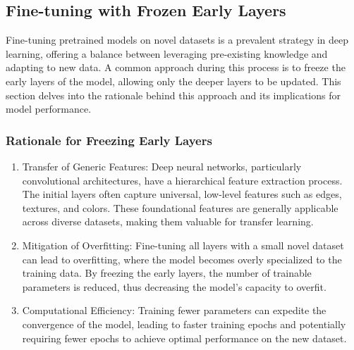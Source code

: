 \documentclass{article}
\begin{document}
\subsection{Fine-tuning with Frozen Early Layers}

Fine-tuning pretrained models on novel datasets is a prevalent strategy in deep learning, offering a balance between leveraging pre-existing knowledge and adapting to new data. A common approach during this process is to freeze the early layers of the model, allowing only the deeper layers to be updated. This section delves into the rationale behind this approach and its implications for model performance.

\subsubsection{Rationale for Freezing Early Layers}

\begin{enumerate}
\item Transfer of Generic Features: Deep neural networks, particularly convolutional architectures, have a hierarchical feature extraction process. The initial layers often capture universal, low-level features such as edges, textures, and colors. These foundational features are generally applicable across diverse datasets, making them valuable for transfer learning.

\item Mitigation of Overfitting: Fine-tuning all layers with a small novel dataset can lead to overfitting, where the model becomes overly specialized to the training data. By freezing the early layers, the number of trainable parameters is reduced, thus decreasing the model's capacity to overfit.

\item Computational Efficiency: Training fewer parameters can expedite the convergence of the model, leading to faster training epochs and potentially requiring fewer epochs to achieve optimal performance on the new dataset.
\end{enumerate}
\end{document}
